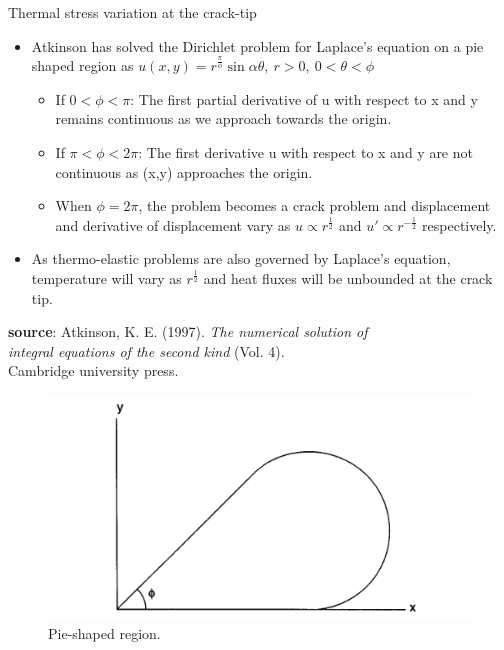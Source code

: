 \documentclass{beamer}
\begin{document}
\begin{frame}[t,fragile]{Thermal stress variation at the crack-tip}
    \vspace{-.3cm}
    \footnotesize
\begin{itemize}
    \item Atkinson has solved the Dirichlet problem for Laplace's equation on a pie shaped region as $u(x,y)= r^{\frac{\pi}{\phi}}\sin\alpha\theta,\  r>0,\ 0<\theta<\phi$
        \begin{itemize}
                \footnotesize
    \item If $0<\phi<\pi$:
        The first partial derivative of u with respect to x and y remains continuous as we approach towards the origin. 
    \item If $\pi<\phi<2\pi$:
        The first derivative u with respect to x and y are not continuous as (x,y) approaches the origin. 
       \item When $\phi=2\pi$, the problem becomes a crack problem and displacement and derivative of displacement vary as $u \propto r^{\frac{1}{2}}$ and $u'\propto  r^{-\frac{1}{2}}$ respectively. 
  \end{itemize}
   \item As thermo-elastic problems are also governed by Laplace's equation, temperature will vary as $r^{\frac{1}{2}}$ and heat fluxes will be unbounded at the crack tip. 
\end{itemize}
  \tiny
  \vspace{10pt}
  \hspace{10pt}
   \textbf{source}: Atkinson, K. E. (1997).
    \emph{The numerical solution of \\
  \hspace{10pt}
    integral equations of the second kind} (Vol. 4). \\
  \hspace{10pt}
    Cambridge university press.
     \begin{figure}
    \centering
    \vspace{-50pt}
    \includegraphics[width=.3\textwidth]{pie.png}
    \caption{\footnotesize Pie-shaped region.}
    \label{pie}
\end{figure}
 
\end{frame}
\end{document}
